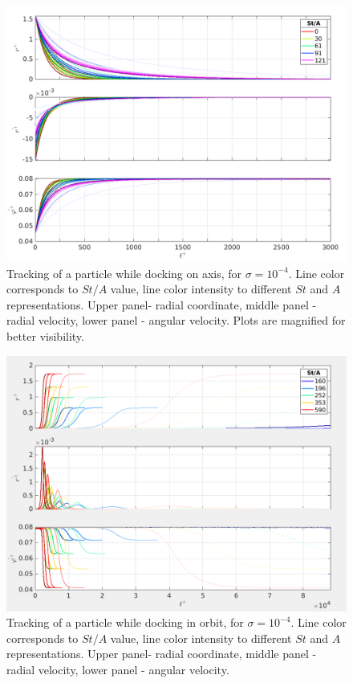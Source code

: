 \documentclass[../main.tex]{subfiles}
\begin{document}
\begin{figure}
\centering
\noindent \includegraphics[width=30pc]{gfx/point_docking_vel_traj_in_time_noscal.png}
\caption{Tracking of a particle while docking on axis, for  $\sigma=10^{-4}$. Line color corresponds to $St/A$ value, line color intensity to different $St$ and $A$ representations. Upper panel- radial coordinate, middle panel - radial velocity, lower panel - angular velocity. Plots are magnified for better visibility.}
\label{fig:ch3_42}
\end{figure}

\begin{figure}
\centering
\noindent \includegraphics[width=30pc]{gfx/orbit_docking_vel_traj_in_time_noscal.png}
\caption{Tracking of a particle while docking in orbit, for $\sigma=10^{-4}$. Line color corresponds to $St/A$ value, line color intensity to different $St$ and $A$ representations. Upper panel- radial coordinate, middle panel - radial velocity, lower panel - angular velocity.}
\label{fig:ch3_41}
\end{figure}
\end{document}
